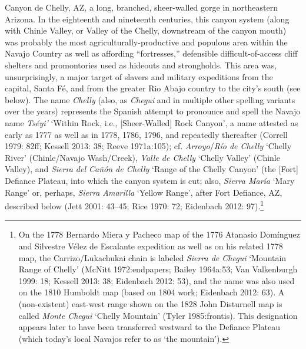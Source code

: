 Canyon de Chelly, AZ, a long, branched, sheer-walled gorge in northeastern Arizona.  In the eighteenth and nineteenth centuries, this canyon system (along with Chinle Valley, or Valley of the Chelly, downstream of the canyon mouth) was probably the most agriculturally-productive and populous area within the Navajo Country as well as affording “fortresses,” defensible difficult-of-access cliff shelters and promontories used as hideouts and strongholds.  This area was, unsurprisingly, a major target of slavers and military expeditions from the capital, Santa Fé, and from the greater Rio Abajo country to the city’s south (see below).  The name \textit{Chelly} (also, as \textit{Chegui} and in multiple other spelling variants over the years) represents the Spanish attempt to pronounce and spell the Navajo name \textit{Tséyi’} ‘Within Rock, i.e., [Sheer-Walled] Rock Canyon’, a name attested as early as 1777 as well as in 1778, 1786, 1796, and repeatedly thereafter (Correll 1979: 82ff; Kessell 2013: 38; Reeve 1971a:105); cf. \textit{Arroyo}/\textit{Río de Chelly} ‘Chelly River’ (Chinle/Navajo Wash/Creek), \textit{Valle de Chelly} ‘Chelly Valley’ (Chinle Valley), and \textit{Sierra del Cañón de Chelly} ‘Range of the Chelly Canyon’ (the [Fort] Defiance Plateau, into which the canyon system is cut; also, \textit{Sierra María} ‘Mary Range’ or, perhaps, \textit{Sierra Amarilla} ‘Yellow Range’, after Fort Defiance, AZ, described below (Jett 2001: 43–45; Rice 1970: 72; Eidenbach 2012: 97).\footnote{On the 1778 Bernardo Miera y Pacheco map of the 1776 Atanasio Domínguez and Silvestre Vélez de Escalante expedition as well as on his related 1778 map, the Carrizo/Lukachukai chain is labeled \textit{Sierra de Chegui} ‘Mountain Range of Chelly’ (McNitt 1972:endpapers; Bailey 1964a:53; Van Valkenburgh 1999: 18; Kessell 2013: 38; Eidenbach 2012: 53), and the name was also used on the 1810 Humboldt map (based on 1804 work; Eidenbach 2012: 63).  A (non-existent) east-west range shown on the 1828 John Disturnell map is called \textit{Monte Chegui} ‘Chelly Mountain’ (Tyler 1985:frontis).  This designation appears later to have been transferred westward to the Defiance Plateau (which today’s local Navajos refer to as `the mountain').}

